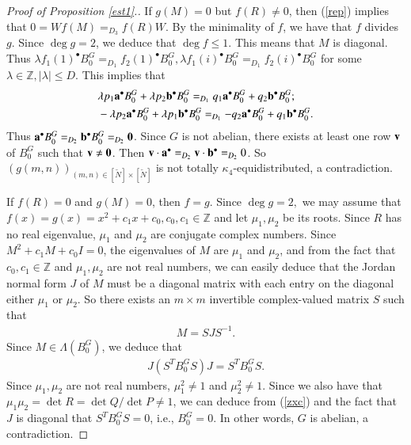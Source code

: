 \documentclass[12pt,amstex]{amsart}
\theoremstyle{definition}
\def \D {\kappa}
\def \a {\bold{a}}
\def \b {\bold{b}}
\begin{document}
\begin{proof}[Proof of Proposition \ref{est1}.]
If $g(M)=0$ but $f(R)\neq 0$, then (\ref{rep}) implies that $0=Wf(M)=_{D_{3}}f(R)W$. By the minimality of $f$, we have that $f$ divides $g$. Since $\deg g=2$, we deduce that $\deg f\leq 1$. This means that $M$ is diagonal. Thus $\lambda f_{1}(1)^{\bullet}B_{0}^{G}=_{D_{1}}f_{2}(1)^{\bullet}B_{0}^{G},\lambda f_{1}(i)^{\bullet}B_{0}^{G}=_{D_{1}}f_{2}(i)^{\bullet}B_{0}^{G}$ for some $\lambda\in\mathbb{Z}, \vert\lambda\vert\leq D$. This implies that
\begin{equation}\nonumber
  \begin{split}
  &\lambda p_{1}\a^{\bullet} B_{0}^{G}+\lambda p_{2}\b^{\bullet} B_{0}^{G}=_{D_{1}}q_{1}\a^{\bullet} B_{0}^{G}+q_{2}\b^{\bullet} B_{0}^{G};
    \\& -\lambda p_{2}\a^{\bullet} B_{0}^{G}+\lambda p_{1}\b^{\bullet} B_{0}^{G}=_{D_{1}}-q_{2}\a^{\bullet} B_{0}^{G}+q_{1}\b^{\bullet} B_{0}^{G}.
  \end{split}
\end{equation}
Thus $\a^{\bullet} B_{0}^{G}=_{D_{2}}\b^{\bullet} B_{0}^{G}=_{D_{2}}\bold{0}$. Since $G$ is not abelian, there exists at least one row $\bold{v}$ of $B_{0}^{G}$ such that $\bold{v}\neq\bold{0}$.
Then $\bold{v}\cdot\a^{\bullet}=_{D_{2}}\bold{v}\cdot\b^{\bullet}=_{D_{2}}0$. So $(g(m,n))_{(m,n)\in[\tilde{N}]\times[\tilde{N}]}$ is not totally $\D_{4}$-equidistributed, a contradiction.

If $f(R)=0$ and $g(M)=0$, then $f=g$. Since
$\deg g=2,$ we may assume that $f(x)=g(x)=x^{2}+c_{1}x+c_{0}, c_{0},c_{1}\in\mathbb{Z}$ and let $\mu_{1},\mu_{2}$
be its roots. Since $R$ has no real eigenvalue, $\mu_{1}$ and $\mu_{2}$ are conjugate complex numbers. Since $M^{2}+c_{1}M+c_{0}I=0$, the eigenvalues of $M$ are $\mu_{1}$ and $\mu_{2}$, and from the fact that $c_{0},c_{1}\in\mathbb{Z}$ and $\mu_{1}, \mu_{2}$ are not real numbers, we can easily
deduce that the Jordan normal form $J$ of $M$ must be a diagonal matrix with each entry on the diagonal either $\mu_{1}$ or $\mu_{2}$. So
there exists an $m\times m$ invertible complex-valued matrix $S$ such that
\begin{equation}\nonumber
\begin{split}
M=SJS^{-1}.
\end{split}
\end{equation}
Since $M\in\Lambda(B_{0}^{G})$, we deduce that
\begin{equation}\label{zxc}
\begin{split}
J(S^{T}B_{0}^{G}S)J=S^{T}B_{0}^{G}S.
\end{split}
\end{equation}
Since $\mu_{1}, \mu_{2}$ are not real numbers, $\mu_{1}^{2}\neq 1$ and $\mu_{2}^{2}\neq 1$. Since we also have that $\mu_{1}\mu_{2}=\det R=\det Q/\det P\neq 1$, we can deduce from (\ref{zxc}) and the fact that $J$ is diagonal that $S^{T}B_{0}^{G}S=0$, i.e., $B_{0}^{G}=0$. In other words, $G$ is abelian, a contradiction.
\end{proof}
\end{document}
